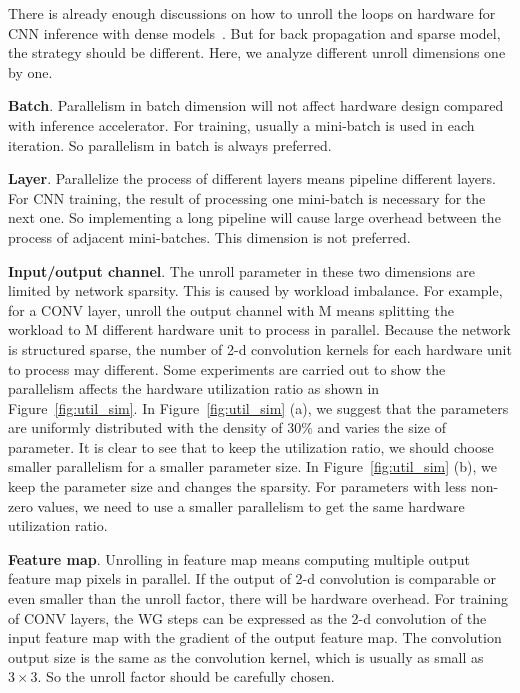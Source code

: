 There is already enough discussions on how to unroll the loops on hardware for CNN inference with dense models~\cite{zhang2015optimizing,mao2017exploring}. But for back propagation and sparse model, the strategy should be different. Here, we analyze different unroll dimensions one by one.

{\bf{Batch}}. Parallelism in batch dimension will not affect hardware design compared with inference accelerator. For training, usually a mini-batch is used in each iteration. So parallelism in batch is always preferred.

{\bf{Layer}}. Parallelize the process of different layers means pipeline different layers. For CNN training, the result of processing one mini-batch is necessary for the next one. So implementing a long pipeline will cause large overhead between the process of adjacent mini-batches. This dimension is not preferred.

{\bf{Input/output channel}}. The unroll parameter in these two dimensions are limited by network sparsity. This is caused by workload imbalance. For example, for a CONV layer, unroll the output channel with M means splitting the workload to M different hardware unit to process in parallel. Because the network is structured sparse, the number of 2-d convolution kernels for each hardware unit to process may different. Some experiments are carried out to show the parallelism affects the hardware utilization ratio as shown in Figure~\ref{fig:util_sim}. In Figure~\ref{fig:util_sim} (a), we suggest that the parameters are uniformly distributed with the density of $30\%$ and varies the size of parameter. It is clear to see that to keep the utilization ratio, we should choose smaller parallelism for a smaller parameter size. In Figure~\ref{fig:util_sim} (b), we keep the parameter size and changes the sparsity. For parameters with less non-zero values, we need to use a smaller parallelism to get the same hardware utilization ratio.

{\bf{Feature map}}. Unrolling in feature map means computing multiple output feature map pixels in parallel. If the output of 2-d convolution is comparable or even smaller than the unroll factor, there will be hardware overhead. For training of CONV layers, the WG steps can be expressed as the 2-d convolution of the input feature map with the gradient of the output feature map. The convolution output size is the same as the convolution kernel, which is usually as small as $3\times 3$. So the unroll factor should be carefully chosen.

